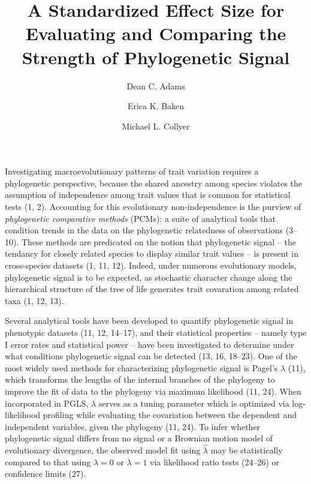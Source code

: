 \documentclass[9pt,twocolumn,twoside,lineno]{pnas-new}
\title{A Standardized Effect Size for Evaluating and Comparing the Strength of
Phylogenetic Signal}
\author[a,2]{Dean C. Adams}
\author[a,b]{Erica K. Baken}
\author[b]{Michael L. Collyer}
\affil[a]{Department of Ecology, Evolution, and Organismal Biology, Iowa State
University, Ames, Iowa, 50010. USA.}
\affil[b]{Department of Science, Chatham University, Pittsburgh, Pennsylvania,
15232. USA.}
\begin{document}
\verticaladjustment{-2pt}

\maketitle
\thispagestyle{firststyle}



Investigating macroevolutionary patterns of trait variation requires a
phylogenetic perspective, because the shared ancestry among species
violates the assumption of independence among trait values that is
common for statistical tests (1, 2). Accounting for this evolutionary
non-independence is the purview of \emph{phylogenetic comparative
methods} (PCMs): a suite of analytical tools that condition trends in
the data on the phylogenetic relatedness of observations (3--10). These
methods are predicated on the notion that phylogenetic signal -- the
tendancy for closely related species to display similar trait values --
is present in cross-species datasets (1, 11, 12). Indeed, under numerous
evolutionary models, phylogenetic signal is to be expected, as
stochastic character change along the hierarchical structure of the tree
of life generates trait covaration among related taxa (1, 12, 13).

Several analytical tools have been developed to quantify phylogenetic
signal in phenotypic datasets (11, 12, 14--17), and their statistical
properties -- namely type I error rates and statistical power -- have
been investigated to determine under what conditions phylogenetic signal
can be detected (13, 16, 18--23). One of the most widely used methods
for characterizing phylogenetic signal is Pagel's \(\lambda\) (11),
which transforms the lengths of the internal branches of the phylogeny
to improve the fit of data to the phylogeny via maximum likelihood (11,
24). When incorporated in PGLS, \(\lambda\) serves as a tuning parameter
which is optimized via log-likelihood profiling while evaluating the
covariation between the dependent and independent variables, given the
phylogeny (11, 24). To infer whether phylogenetic signal differs from no
signal or a Brownian motion model of evolutionary divergence, the
observed model fit using \(\hat\lambda\) may be statistically compared
to that using \(\lambda=0\) or \(\lambda=1\) via likelihood ratio tests
(24--26) or confidence limits (27).
\end{document}
